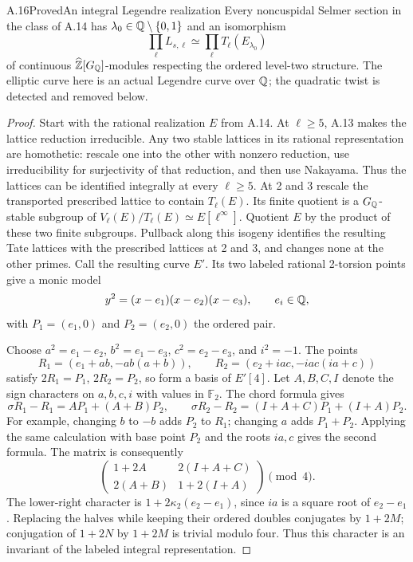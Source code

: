 \begin{statement}{A.16}{Proved}{An integral Legendre realization}
Every noncuspidal Selmer section in the class of A.14 has
$\lambda_0\in\mathbb Q\setminus\{0,1\}$ and an isomorphism
\[
             \prod_\ell L_{s,\ell}\simeq
             \prod_\ell T_\ell(E_{\lambda_0})
\tag{A.16.1}
\]
of continuous $\widehat{\mathbb Z}[G_\mathbb Q]$-modules respecting the ordered
level-two structure.  The elliptic curve here is an actual Legendre
curve over $\mathbb Q$; the quadratic twist is detected and removed below.
\end{statement}
\begin{proof}
Start with the rational realization $E$ from A.14.  At $\ell\ge5$,
A.13 makes the lattice reduction irreducible.  Any two stable lattices
in its rational representation are homothetic: rescale one into the
other with nonzero reduction, use irreducibility for surjectivity of
that reduction, and then use Nakayama.  Thus the lattices can be
identified integrally at every $\ell\ge5$.
At 2 and 3 rescale the transported prescribed lattice to contain
$T_\ell(E)$.  Its finite quotient is a $G_\mathbb Q$-stable subgroup of
$V_\ell(E)/T_\ell(E)\simeq E[\ell^\infty]$.  Quotient $E$ by the
product of these two finite subgroups.  Pullback along this isogeny
identifies the resulting Tate lattices with the prescribed lattices at
2 and 3, and changes none at the other primes.  Call the resulting
curve $E'$.  Its two labeled rational 2-torsion points give a monic
model
\[
                 y^2=(x-e_1)(x-e_2)(x-e_3),\qquad e_i\in\mathbb Q,
\]
with $P_1=(e_1,0)$ and $P_2=(e_2,0)$ the ordered pair.

Choose $a^2=e_1-e_2$, $b^2=e_1-e_3$, $c^2=e_2-e_3$, and $i^2=-1$.
The points
\[
 R_1=(e_1+ab,-ab(a+b)),\qquad
 R_2=(e_2+iac,-iac(ia+c))
\]
satisfy $2R_1=P_1$, $2R_2=P_2$, so form a basis of $E'[4]$.
Let $A,B,C,I$ denote the sign characters on $a,b,c,i$ with values in
$\mathbb F_2$.  The chord formula gives
\[
 \sigma R_1-R_1=A P_1+(A+B)P_2,\qquad
 \sigma R_2-R_2=(I+A+C)P_1+(I+A)P_2.
\]
For example, changing $b$ to $-b$ adds $P_2$ to $R_1$;
changing $a$ adds $P_1+P_2$.  Applying the same calculation with
base point $P_2$ and the roots $ia,c$ gives the second formula.
The matrix is consequently
\[
 \begin{pmatrix}1+2A&2(I+A+C)\\2(A+B)&1+2(I+A)\end{pmatrix}
                  \pmod4.
\tag{A.16.2}
\]
The lower-right character is $1+2\kappa_2(e_2-e_1)$, since
$ia$ is a square root of $e_2-e_1$.  Replacing the halves while keeping
their ordered doubles conjugates by $1+2M$; conjugation of $1+2N$ by
$1+2M$ is trivial modulo four.  Thus this character is an invariant of
the labeled integral representation.


\end{proof}
